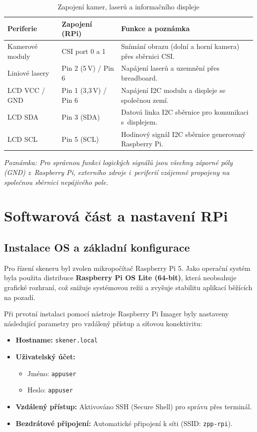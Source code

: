 \documentclass[12pt,a4paper]{report}
\begin{document}
\begin{table}[H]
    \centering
    \begin{tabular}{|l|l|p{7cm}|}
        \hline
        \textbf{Periferie} & \textbf{Zapojení (RPi)} & \textbf{Funkce a poznámka} \\ \hline
        Kamerové moduly & CSI port 0 a 1 & Snímání obrazu (dolní a horní kamera) přes sběrnici CSI. \\ \hline
        Liniové lasery & Pin 2 (5\,V) / Pin 6 & Napájení laserů a uzemnění přes \mbox{breadboard}. \\ \hline
        LCD VCC / GND & Pin 1 (3,3\,V) / Pin 6 & Napájení I2C modulu a displeje se \mbox{společnou} zemí. \\ \hline
        LCD SDA & Pin 3 (SDA) & Datová linka I2C sběrnice pro \mbox{komunikaci} s~displejem. \\ \hline
        LCD SCL & Pin 5 (SCL) & Hodinový signál I2C sběrnice \mbox{generovaný} Raspberry Pi. \\ \hline
    \end{tabular}
    \caption{Zapojení kamer, laserů a informačního displeje}
\end{table}

\textit{Poznámka: Pro správnou funkci logických signálů jsou všechny záporné póly (GND) z~Raspberry Pi, externího zdroje i~periferií vzájemně propojeny na společnou sběrnici nepájivého pole.}

\chapter{Softwarová část a nastavení RPi}

\section{Instalace OS a základní konfigurace}
Pro řízení skeneru byl zvolen mikropočítač Raspberry Pi 5. Jako operační systém byla použita distribuce \textbf{Raspberry Pi OS Lite (64-bit)}, která neobsahuje grafické rozhraní, což snižuje systémovou režii a zvyšuje stabilitu aplikací běžících na pozadí.

Při prvotní instalaci pomocí nástroje Raspberry Pi Imager byly nastaveny následující parametry pro vzdálený přístup a síťovou konektivitu:

\begin{itemize}
    \item \textbf{Hostname:} \texttt{skener.local}
    \item \textbf{Uživatelský účet:} 
    \begin{itemize}
        \item Jméno: \texttt{appuser}
        \item Heslo: \texttt{appuser}
    \end{itemize}
    \item \textbf{Vzdálený přístup:} Aktivováno SSH (Secure Shell) pro správu přes terminál.
    \item \textbf{Bezdrátové připojení:} Automatické připojení k síti (SSID: \texttt{zpp-rpi}).
\end{itemize}
\end{document}
